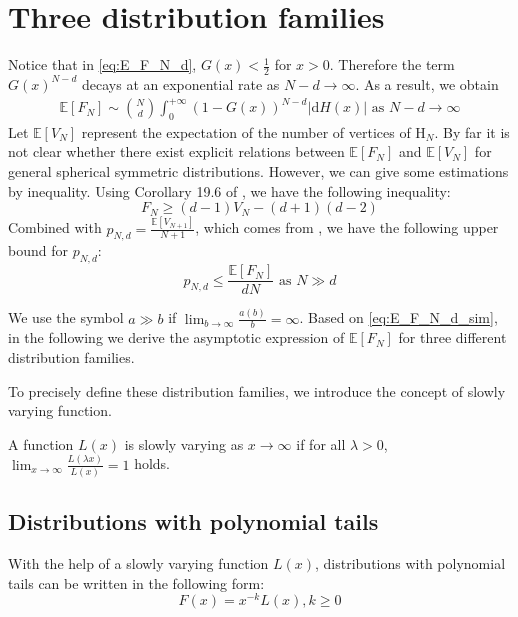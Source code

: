 \documentclass{aptpub}
\def\E{\mathbb{E}}
\def\d{\mathrm{d}}
\begin{document}
\section{Three distribution families}\label{sec:three_distriutions}
Notice that in \eqref{eq:E_F_N_d}, $G(x)<\frac{1}{2}$ for $x>0$. Therefore the
term $G(x)^{N-d}$ decays at an exponential rate as $N-d\to \infty$.
As a result, we obtain
\begin{align}
     \E[F_N] \sim \binom{N}{d} \int_0^{+\infty} 
      (1-G(x))^{N-d} |\d H(x)| \textrm{ as } N-d\to \infty
     \label{eq:E_F_N_d_sim}
\end{align}
Let $\E[V_N]$ represent the expectation of the number of
vertices of $\mathrm{H}_N$.
By far it is not clear whether there exist explicit relations
between $\E[F_N]$ and $\E[V_N]$
for general spherical symmetric distributions.
However, we can give some estimations by inequality.
Using Corollary 19.6 of \cite{brondsted2012introduction}, we have the following
inequality:
\begin{equation}\label{eq:F_V_upper}
     F_N \geq (d-1) V_N - (d+1)(d-2)
 \end{equation}
Combined with $p_{N,d} = \frac{\E[V_{N+1}]}{N+1}$, which comes from
\cite{efron1965convex}, we have the following upper bound for $p_{N,d}$:
\begin{equation}\label{eq:p_N_d_bound}
    p_{N,d} \leq \frac{\E[F_N]}{d N} \textrm{ as } N \gg d
\end{equation}

We use the symbol $a \gg b$ if $\lim_{b\to \infty} \frac{a(b)}{b} = \infty$.
Based on \eqref{eq:E_F_N_d_sim}, in the following
we derive the asymptotic expression of $\E[F_N]$
for three different distribution families.

To precisely define these distribution families, we introduce the concept of slowly varying function.
\begin{definition}
A function $L(x)$ is
slowly varying as $x\to \infty$
if for all $\lambda>0$,
$\lim_{x\to\infty}\frac{L(\lambda x)}{L(x)}=1$
holds.
\end{definition}

\subsection{Distributions with polynomial tails}

With the help of a slowly varying function $L(x)$,
distributions with polynomial tails can be written
in the following form:
\begin{equation}\label{eq:F_poly_tail}
     F(x) = x^{-k} L(x), k\geq 0
\end{equation}
\end{document}
